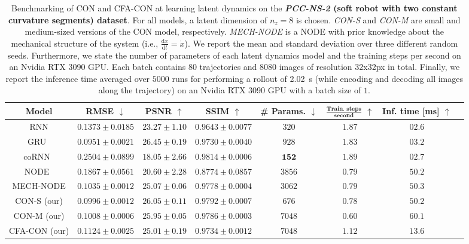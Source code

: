 \begin{table}[ht]
    \centering
    \begin{scriptsize}
    \setlength\tabcolsep{2.0pt}
    \begin{tabular}{c c c c c c c c}
         \toprule
         \textbf{Model} & \textbf{RMSE} $\downarrow$ & \textbf{PSNR} $\uparrow$ & \textbf{SSIM} $\uparrow$ & \textbf{\# Params.} $\downarrow$ & $\mathbf{\frac{\text{Train. steps}}{\text{second}}}$ $\uparrow$ & \textbf{Inf. time} [ms] $\uparrow$\\
         \midrule
         RNN & $0.1373 \pm 0.0185$ & $23.27 \pm 1.10$ & $0.9643 \pm 0.0077$ & $320$ & $1.87$ & $02.6$\\
         GRU~\citep{cho2014learning} & $0.0951 \pm 0.0021$ & $\mathbf{26.45 \pm 0.19}$ & $0.9730 \pm 0.0040$ & $928$ & $1.83$ & $03.2$\\
         coRNN~\citep{rusch2020coupled} & $0.2504 \pm 0.0899$ & $18.05 \pm 2.66$ & $0.9814 \pm 0.0006$ & $\mathbf{152}$ & $\mathbf{1.89}$ & $02.7$\\
         NODE~\citep{chen2018neural} & $0.1867 \pm 0.0561$ & $20.60 \pm 2.28$ & $0.8774 \pm 0.0857$ & $3856$ & $0.79$ & $50.2$\\
         MECH-NODE & $0.1035 \pm 0.0012$ & $25.07 \pm 0.06$ & $0.9778 \pm 0.0004$ & $3062$ & $0.79$ & $50.3$\\
         CON-S (our) & $0.0996 \pm 0.0012$ & $26.05 \pm 0.11$ & $\mathbf{0.9792 \pm 0.0007}$ & $676$ & $0.78$ & $50.2$\\
         CON-M (our) & $0.1008 \pm 0.0006$ & $25.95 \pm 0.05$ & $0.9786 \pm 0.0003$ & $7048$ & $0.60$ & $60.1$\\
         CFA-CON (our) & $0.1124 \pm 0.0025$ & $25.01 \pm 0.19$ & $0.9734 \pm 0.0012$ & $7048$ & $1.12$ & $13.6$\\
         \bottomrule
    \end{tabular}
    \end{scriptsize}
    \vspace{0.5cm}
    \caption{Benchmarking of \gls{CON} and \gls{CFA-CON} at learning latent dynamics on the \textbf{\emph{PCC-NS-2} (soft robot with two constant curvature segments) dataset}. For all models, a latent dimension of $n_z=8$ is chosen. \emph{CON-S} and \emph{CON-M} are small and medium-sized versions of the \gls{CON} model, respectively. \emph{MECH-NODE} is a \gls{NODE} with prior knowledge about the mechanical structure of the system (i.e., $\frac{\mathrm{d}x}{\mathrm{d}t} = \dot{x}$). We report the mean and standard deviation over three different random seeds. Furthermore, we state the number of parameters of each latent dynamics model and the training steps per second on an Nvidia RTX 3090 GPU. Each batch contains $80$ trajectories and $8080$ images of resolution 32x32px in total. Finally, we report the inference time averaged over $5000$ runs for performing a rollout of \SI{2.02}{s} (while encoding and decoding all images along the trajectory) on an Nvidia RTX 3090 GPU with a batch size of $1$.
}
    \label{tab:apx-con:latent_dynamics_results:pcc_ns-2}
\end{table}


